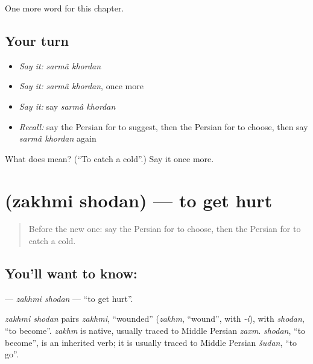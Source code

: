\begin{grammarlens}[title={What you've built}]
One more word for this chapter.
\end{grammarlens}

\subsection*{Your turn}
\begin{itemize}
\raggedright
  \item \emph{Say it:} \emph{sarmâ khordan}
  \item \emph{Say it:} \emph{sarmâ khordan}, once more
  \item \emph{Say it:} say \emph{sarmâ khordan}
  \item \emph{Recall:} say the Persian for to suggest, then the Persian for to choose, then say \emph{sarmâ khordan} again
\end{itemize}

\begin{tcolorbox}[breakable,colback=teal!4,colframe=teal!35!black,title={Before you move on}]
What does   mean? (\textquotedblleft{}To catch a cold\textquotedblright{}.) Say it once more.
\end{tcolorbox}
\section[\texorpdfstring{\fa{زخمی} \fa{شدن} (zakhmi shodan)}{زخمی شدن (zakhmi shodan)}]{  (zakhmi shodan) — to get hurt}

\label{lesson:FA-C142-zakhmi-shodan}



\begin{quote}
Before the new one: say the Persian for to choose, then the Persian for to catch a cold.
\end{quote}

\subsection*{You'll want to know:  }
\textbf{ } — \emph{zakhmi shodan} — \textquotedblleft{}to get hurt\textquotedblright{}.

\begin{cousinweb}
\emph{zakhmi shodan} pairs \emph{zakhmi}, \textquotedblleft{}wounded\textquotedblright{} (\emph{zakhm}, \textquotedblleft{}wound\textquotedblright{}, with \emph{-i}), with \emph{shodan}, \textquotedblleft{}to become\textquotedblright{}. \emph{zakhm} is native, usually traced to Middle Persian \emph{zaxm}. \emph{shodan}, \textquotedblleft{}to become\textquotedblright{}, is an inherited verb; it is usually traced to Middle Persian \emph{šudan}, \textquotedblleft{}to go\textquotedblright{}.
\end{cousinweb}

